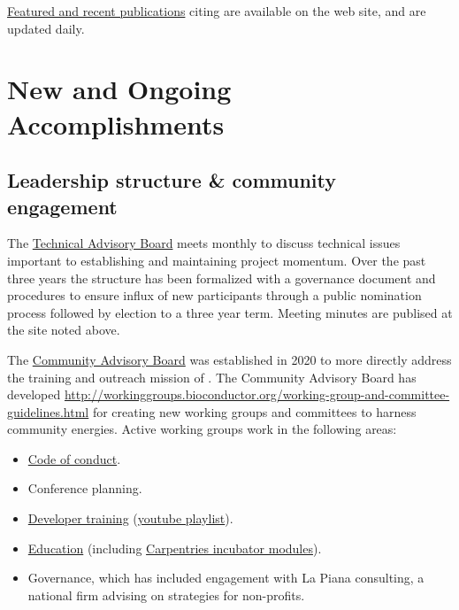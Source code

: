 \documentclass[letterpaper]{article}
\begin{document}
\href{https://bioconductor.org/help/publications/}{Featured and recent
  publications} citing \Bioconductor{} are available on the
\Bioconductor{} web site, and are updated daily. 

\section{New and Ongoing Accomplishments}

\subsection{Leadership structure \& community engagement}

The \href{https://bioconductor.org/about/technical-advisory-board/}{Technical Advisory Board} meets
monthly to discuss technical issues important to establishing and
maintaining project momentum. Over the past three years the structure
has been formalized with a governance document and procedures to
ensure influx of new participants through a public nomination process
followed by election to a three year term. 
Meeting minutes are publised at the site noted above.

The \href{https://bioconductor.org/about/community-advisory-board/}{Community Advisory Board} was established in 2020 to more
directly address the training and outreach mission of
\Bioconductor.  The Community Advisory Board has developed
\href{guidelines}{http://workinggroups.bioconductor.org/working-group-and-committee-guidelines.html}
for creating new working groups and committees to harness community energies.  Active working
groups work in the following areas:
\begin{itemize}
\item \href{https://github.com/Bioconductor/bioc_coc_multilingual}{Code of conduct}.
\item Conference planning.
\item \href{http://bioconductor.org/developers/new-developer-program/}{Developer training} (\href{https://www.youtube.com/watch?v=CcJgcDy2qEI&list=PLdl4u5ZRDMQQLMupAtEzm2y4gUIUm_1n6}{youtube playlist}).
\item \href{https://github.com/bioconductor/bioconductor-teaching}{Education} (including \href{https://github.com/carpentries-incubator/bioc-intro}{Carpentries incubator modules}).
\item Governance, which has included engagement with La Piana consulting, a national firm advising on 
strategies for non-profits.
\end{itemize}
\end{document}

